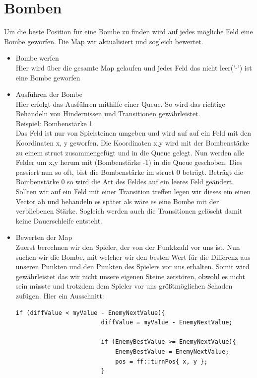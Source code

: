 \documentclass[12pt,a4paper,bibliography=totocnumbered,listof=totocnumbered]{scrartcl}
\begin{document}
\section{Bomben}
Um die beste Position für eine Bombe zu finden wird auf jedes mögliche Feld eine Bombe geworfen. Die Map wir aktualisiert und sogleich bewertet.

\begin{itemize}
\item Bombe werfen\\
Hier wird über die gesamte Map gelaufen und jedes Feld das nicht leer('-') ist eine Bombe geworfen
\item Ausführen der Bombe\\
Hier erfolgt das Ausführen mithilfe einer Queue. So wird das richtige Behandeln von Hindernissen und Transitionen gewährleistet. \\
Beispiel:
Bombenstärke 1\\
Das Feld ist nur von Spielsteinen umgeben und wird auf auf ein Feld mit den Koordinaten x, y geworfen. Die Koordinaten x,y wird mit der Bombenstärke zu einem struct zusammengefügt und in die Queue gelegt. Nun werden alle Felder um x,y herum mit (Bombenstärke -1) in die Queue geschoben. Dies passiert nun so oft, bist die Bombenstärke im struct 0 beträgt. Beträgt die Bombenstärke 0 so wird die Art des Feldes auf ein leeres Feld geändert. Sollten wir auf ein Feld mit einer Transition treffen legen wir dieses ein einen Vector ab und behandeln es später als wäre es eine Bombe mit der verbliebenen Stärke. Sogleich werden auch die Transitionen gelöscht damit keine Dauerschleife entsteht.
\item Bewerten der Map\\
Zuerst berechnen wir den Spieler, der von der Punktzahl vor uns ist. Nun suchen wir die Bombe, mit welcher wir den besten Wert für die Differenz aus unseren Punkten und den Punkten des Spielers vor uns erhalten. Somit wird gewährleistet das wir nicht unsere eigenen Steine zerstören, obwohl es nicht sein müsste und trotzdem dem Spieler vor uns größtmöglichen Schaden zufügen. Hier ein Ausschnitt:

\vspace{1em}
\begin{lstlisting}[caption=bombPos, label=lst:AlgorithmBase.cpp]
if (diffValue < myValue - EnemyNextValue){						
						diffValue = myValue - EnemyNextValue;

						if (EnemyBestValue >= EnemyNextValue){								
							EnemyBestValue = EnemyNextValue;								
							pos = ff::turnPos{ x, y };									
						}
\end{lstlisting}

\end{itemize}
\pagebreak
\end{document}
